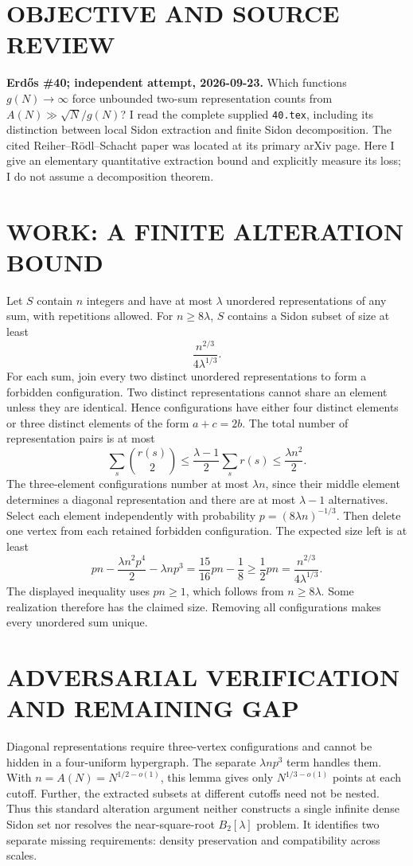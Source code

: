 \section{OBJECTIVE AND SOURCE REVIEW}
\textbf{Erd\H{o}s \#40; independent attempt, 2026-09-23.}
Which functions $g(N)\to\infty$ force unbounded two-sum representation counts from $A(N)\gg\sqrt N/g(N)$? I read the complete supplied \texttt{40.tex}, including its distinction between local Sidon extraction and finite Sidon decomposition. The cited Reiher--R\"odl--Schacht paper was located at its primary arXiv page. Here I give an elementary quantitative extraction bound and explicitly measure its loss; I do not assume a decomposition theorem.

\section{WORK: A FINITE ALTERATION BOUND}
Let $S$ contain $n$ integers and have at most $\lambda$ unordered representations of any sum, with repetitions allowed. For $n\ge8\lambda$, $S$ contains a Sidon subset of size at least
\[
\frac{n^{2/3}}{4\lambda^{1/3}}.
\]
For each sum, join every two distinct unordered representations to form a forbidden configuration. Two distinct representations cannot share an element unless they are identical. Hence configurations have either four distinct elements or three distinct elements of the form $a+c=2b$.
The total number of representation pairs is at most
\[
\sum_s\binom{r(s)}2\le\frac{\lambda-1}2\sum_s r(s)
\le\frac{\lambda n^2}{2}.
\]
The three-element configurations number at most $\lambda n$, since their middle element determines a diagonal representation and there are at most $\lambda-1$ alternatives.
Select each element independently with probability $p=(8\lambda n)^{-1/3}$. Then delete one vertex from each retained forbidden configuration. The expected size left is at least
\[
pn-\frac{\lambda n^2p^4}{2}-\lambda np^3
=\frac{15}{16}pn-\frac18\ge\frac12pn
=\frac{n^{2/3}}{4\lambda^{1/3}}.
\]
The displayed inequality uses $pn\ge1$, which follows from $n\ge8\lambda$. Some realization therefore has the claimed size. Removing all configurations makes every unordered sum unique.

\section{ADVERSARIAL VERIFICATION AND REMAINING GAP}
Diagonal representations require three-vertex configurations and cannot be hidden in a four-uniform hypergraph. The separate $\lambda np^3$ term handles them. With $n=A(N)=N^{1/2-o(1)}$, this lemma gives only $N^{1/3-o(1)}$ points at each cutoff. Further, the extracted subsets at different cutoffs need not be nested. Thus this standard alteration argument neither constructs a single infinite dense Sidon set nor resolves the near-square-root $B_2[\lambda]$ problem. It identifies two separate missing requirements: density preservation and compatibility across scales.

